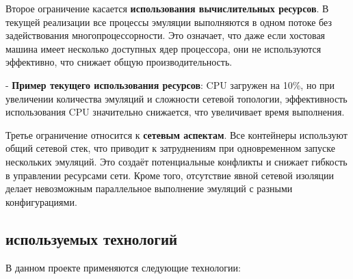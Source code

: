 Второе ограничение касается \textbf{использования вычислительных ресурсов}. В текущей реализации все процессы эмуляции выполняются в одном потоке без задействования многопроцессорности. Это означает, что даже если хостовая машина имеет несколько доступных ядер процессора, они не используются эффективно, что снижает общую производительность.

- \textbf{Пример текущего использования ресурсов}: CPU загружен на 10\%, но при увеличении количества эмуляций и сложности сетевой топологии, эффективность использования CPU значительно снижается, что увеличивает время выполнения.

Третье ограничение относится к \textbf{сетевым аспектам}. Все контейнеры используют общий сетевой стек, что приводит к затруднениям при одновременном запуске нескольких эмуляций. Это создаёт потенциальные конфликты и снижает гибкость в управлении ресурсами сети. Кроме того, отсутствие явной сетевой изоляции делает невозможным параллельное выполнение эмуляций с разными конфигурациями.

\subsection{используемых технологий}

В данном проекте применяются следующие технологии:

